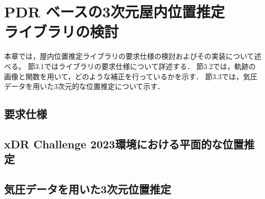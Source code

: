 
\chapter{PDR ベースの3次元屋内位置推定\\ライブラリの検討}
\thispagestyle{myheadings}
本章では，屋内位置推定ライブラリの要求仕様の検討およびその実装について述べる。
節3.1ではライブラリの要求仕様について詳述する．
節3.2では，軌跡の画像と関数を用いて，どのような補正を行っているかを示す．
節3.3では，気圧データを用いた3次元的な位置推定について示す．


\section{要求仕様}




\section{xDR Challenge 2023環境における平面的な位置推定}








\section{気圧データを用いた3次元位置推定}




